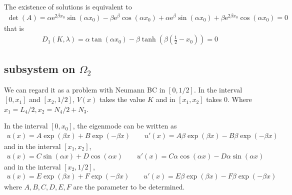 \documentclass[12pt,a4paper]{article}
\begin{document}
\begin{appendices}
The existence of solutions is equivalent to
\begin{align*}
\det(A) = \alpha \mathrm{e}^{2 \beta x_0} \sin\!\left(\alpha x_0\right) - \beta \mathrm{e}^{\beta} \cos\!\left(\alpha x_0\right) + \alpha \mathrm{e}^{\beta} \sin\!\left(\alpha x_0\right) + \beta \mathrm{e}^{2 \beta x_0} \cos\!\left(\alpha x_0\right) = 0
\end{align*}
that is
\begin{align*}
D_1(K, \lambda) = \alpha \tan(\alpha x_0) - \beta \tanh(\beta (\frac12 - x_0)) = 0
\end{align*}

\subsection*{subsystem on $\Omega_2$}

We can regard it as a problem with Neumann BC in $[0, 1/2]$. In the interval $[0, x_1]$ and $[x_2, 1/2]$, $V(x)$ takes the value $K$ and in $[x_1, x_2]$ takes $0$. Where $x_1 = L_4/2, x_2 = N_4/2 + N_3$.

In the interval $[0, x_0]$, the eigenmode can be written as
\begin{align*}
u(x) = A \exp(\beta x) + B \exp(-\beta x) \qquad u'(x) = A \beta \exp(\beta x) - B \beta \exp(-\beta x)
\end{align*}
and in the interval $[x_1, x_2]$,
\begin{align*}
u(x) = C \sin(\alpha x) + D \cos(\alpha x) \qquad u'(x) = C \alpha \cos(\alpha x) - D \alpha \sin(\alpha x)
\end{align*}
and in the interval $[x_2, 1/2]$,
\begin{align*}
u(x) = E \exp(\beta x) + F \exp(-\beta x) \qquad u'(x) = E \beta \exp(\beta x) - F \beta \exp(-\beta x)
\end{align*}
where $A ,B, C, D, E, F$ are the parameter to be determined.


\end{appendices}
\end{document}
